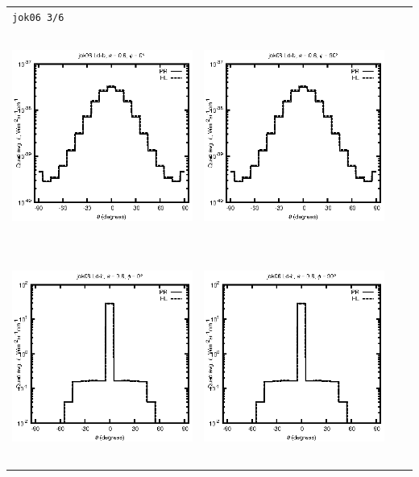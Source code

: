 \begin{tabular}{c c c c}
\multicolumn{4}{l}{\texttt{jok06 3/6}} \\
\includegraphics[height=7cm]{../eps/jok06_Ld_b_fwd.eps} &
\includegraphics[height=7cm]{../eps/jok06_Ld_b_cross.eps} \\
\includegraphics[height=7cm]{../eps/jok06_Ld_it_fwd.eps} &
\includegraphics[height=7cm]{../eps/jok06_Ld_it_cross.eps} \\

\end{tabular}
